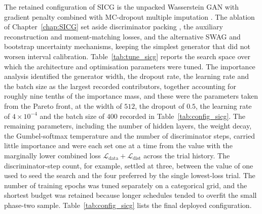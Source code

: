 The retained configuration of SICG is the unpacked Wasserstein GAN with gradient penalty \citep{gulrajani2017improved} combined with MC-dropout multiple imputation \citep{gal2016dropout}. The ablation of Chapter~\ref{chap:SICG} set aside discriminator packing \citep{lin2018pacgan}, the auxiliary reconstruction and moment-matching losses, and the alternative SWAG \citep{maddox2019simple} and bootstrap uncertainty mechanisms, keeping the simplest generator that did not worsen interval calibration. Table~\ref{tab:tune_sicg} reports the search space over which the architecture and optimisation parameters were tuned. The importance analysis identified the generator width, the dropout rate, the learning rate and the batch size as the largest recorded contributors, together accounting for roughly nine tenths of the importance mass, and these were the parameters taken from the Pareto front, at the width of $512$, the dropout of $0.5$, the learning rate of $4 \times 10^{-4}$ and the batch size of $400$ recorded in Table~\ref{tab:config_sicg}. The remaining parameters, including the number of hidden layers, the weight decay, the Gumbel-softmax temperature \citep{jang2017categorical} and the number of discriminator steps, carried little importance and were each set one at a time from the value with the marginally lower combined loss $\mathcal{L}_{\mathrm{data}} + \mathcal{L}_{\mathrm{dist}}$ across the trial history. The discriminator-step count, for example, settled at three, between the value of one used to seed the search and the four preferred by the single lowest-loss trial. The number of training epochs was tuned separately on a categorical grid, and the shortest budget was retained because longer schedules tended to overfit the small phase-two sample. Table~\ref{tab:config_sicg} lists the final deployed configuration.

